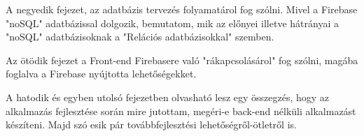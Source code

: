 A negyedik fejezet, az adatbázis tervezés folyamatárol fog szólni. Mivel a Firebase "noSQL" adatbázissal dolgozik, bemutatom, mik az előnyei illetve hátrányai a "noSQL" adatbázisoknak a "Relációs adatbázisokkal" szemben.

Az ötödik fejezet a Front-end Firebasere való "rákapcsolásárol" fog szólni, magába foglalva a Firebase nyújtotta lehetőségekket.

A hatodik és egyben utolsó fejezetben olvasható lesz egy összegzés, hogy az alkalmazás fejlesztése során mire jutottam, megéri-e back-end nélküli alkalmazást készíteni. Majd szó esik pár továbbfejlesztési lehetőségről-ötletről is.

